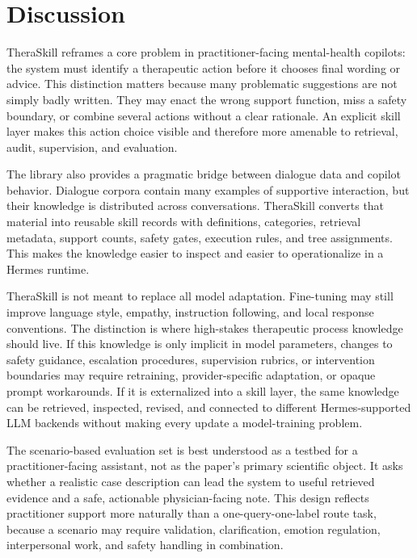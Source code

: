 \documentclass[11pt]{article}
\begin{document}
\section{Discussion}

TheraSkill reframes a core problem in practitioner-facing mental-health copilots: the system must identify a therapeutic action before it chooses final wording or advice. This distinction matters because many problematic suggestions are not simply badly written. They may enact the wrong support function, miss a safety boundary, or combine several actions without a clear rationale. An explicit skill layer makes this action choice visible and therefore more amenable to retrieval, audit, supervision, and evaluation.

The library also provides a pragmatic bridge between dialogue data and copilot behavior. Dialogue corpora contain many examples of supportive interaction, but their knowledge is distributed across conversations. TheraSkill converts that material into reusable skill records with definitions, categories, retrieval metadata, support counts, safety gates, execution rules, and tree assignments. This makes the knowledge easier to inspect and easier to operationalize in a Hermes runtime.

TheraSkill is not meant to replace all model adaptation. Fine-tuning may still improve language style, empathy, instruction following, and local response conventions. The distinction is where high-stakes therapeutic process knowledge should live. If this knowledge is only implicit in model parameters, changes to safety guidance, escalation procedures, supervision rubrics, or intervention boundaries may require retraining, provider-specific adaptation, or opaque prompt workarounds. If it is externalized into a skill layer, the same knowledge can be retrieved, inspected, revised, and connected to different Hermes-supported LLM backends without making every update a model-training problem.

The scenario-based evaluation set is best understood as a testbed for a practitioner-facing assistant, not as the paper's primary scientific object. It asks whether a realistic case description can lead the system to useful retrieved evidence and a safe, actionable physician-facing note. This design reflects practitioner support more naturally than a one-query-one-label route task, because a scenario may require validation, clarification, emotion regulation, interpersonal work, and safety handling in combination.
\end{document}
